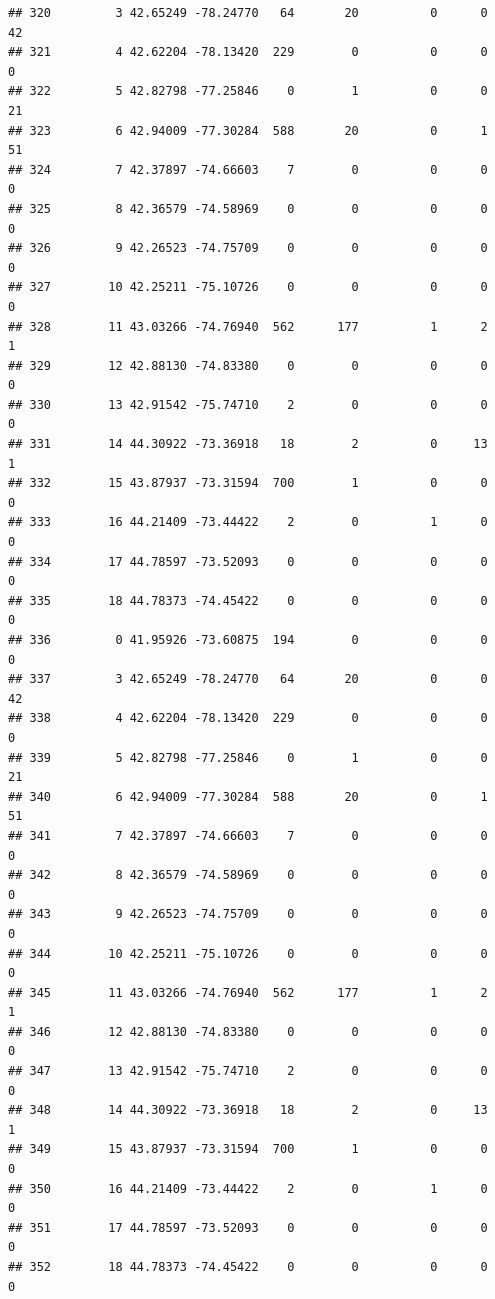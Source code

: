 \documentclass[
]{article}
\begin{document}
\begin{verbatim}
## 320         3 42.65249 -78.24770   64       20          0      0           42
## 321         4 42.62204 -78.13420  229        0          0      0            0
## 322         5 42.82798 -77.25846    0        1          0      0           21
## 323         6 42.94009 -77.30284  588       20          0      1           51
## 324         7 42.37897 -74.66603    7        0          0      0            0
## 325         8 42.36579 -74.58969    0        0          0      0            0
## 326         9 42.26523 -74.75709    0        0          0      0            0
## 327        10 42.25211 -75.10726    0        0          0      0            0
## 328        11 43.03266 -74.76940  562      177          1      2            1
## 329        12 42.88130 -74.83380    0        0          0      0            0
## 330        13 42.91542 -75.74710    2        0          0      0            0
## 331        14 44.30922 -73.36918   18        2          0     13            1
## 332        15 43.87937 -73.31594  700        1          0      0            0
## 333        16 44.21409 -73.44422    2        0          1      0            0
## 334        17 44.78597 -73.52093    0        0          0      0            0
## 335        18 44.78373 -74.45422    0        0          0      0            0
## 336         0 41.95926 -73.60875  194        0          0      0            0
## 337         3 42.65249 -78.24770   64       20          0      0           42
## 338         4 42.62204 -78.13420  229        0          0      0            0
## 339         5 42.82798 -77.25846    0        1          0      0           21
## 340         6 42.94009 -77.30284  588       20          0      1           51
## 341         7 42.37897 -74.66603    7        0          0      0            0
## 342         8 42.36579 -74.58969    0        0          0      0            0
## 343         9 42.26523 -74.75709    0        0          0      0            0
## 344        10 42.25211 -75.10726    0        0          0      0            0
## 345        11 43.03266 -74.76940  562      177          1      2            1
## 346        12 42.88130 -74.83380    0        0          0      0            0
## 347        13 42.91542 -75.74710    2        0          0      0            0
## 348        14 44.30922 -73.36918   18        2          0     13            1
## 349        15 43.87937 -73.31594  700        1          0      0            0
## 350        16 44.21409 -73.44422    2        0          1      0            0
## 351        17 44.78597 -73.52093    0        0          0      0            0
## 352        18 44.78373 -74.45422    0        0          0      0            0

\end{verbatim}
\end{document}
